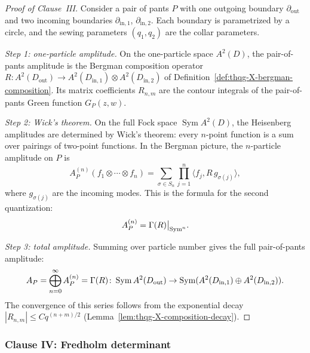 \begin{proof}[Proof of Clause~III]
Consider a pair of pants $P$ with one outgoing boundary $\partial_{\mathrm{out}}$
and two incoming boundaries $\partial_{\mathrm{in},1}$, $\partial_{\mathrm{in},2}$.
Each boundary is parametrized by a circle, and the sewing
parameters $(q_1, q_2)$ are the collar parameters.

\emph{Step 1: one-particle amplitude.}
On the one-particle space $A^2(D)$, the pair-of-pants amplitude
is the Bergman composition operator
$R \colon A^2(D_{\mathrm{out}}) \to
A^2(D_{\mathrm{in},1}) \otimes A^2(D_{\mathrm{in},2})$
of Definition~\ref{def:thqg-X-bergman-composition}.
Its matrix coefficients $R_{n,m}$ are the contour integrals
of the pair-of-pants Green function $G_P(z,w)$.

\emph{Step 2: Wick's theorem.}
On the full Fock space $\operatorname{Sym} A^2(D)$, the
Heisenberg amplitudes are determined by Wick's theorem:
every $n$-point function is a sum over pairings of two-point
functions. In the Bergman picture, the $n$-particle amplitude
on $P$ is
\begin{equation}%
A_P^{(n)}(f_1 \otimes \cdots \otimes f_n)
= \sum_{\sigma \in S_n}
\prod_{j=1}^{n}
\langle f_j, R\,g_{\sigma(j)}\rangle,
\end{equation}
where $g_{\sigma(j)}$ are the incoming modes. This is the formula for the second quantization:
\[
A_P^{(n)}
= \Gamma(R)\big|_{\operatorname{Sym}^n}.
\]

\emph{Step 3: total amplitude.}
Summing over particle number gives the full pair-of-pants
amplitude:
\begin{equation}%
A_P
= \bigoplus_{n=0}^{\infty}
A_P^{(n)}
= \secquant(R)
\colon \operatorname{Sym} A^2(D_{\mathrm{out}})
\to
\operatorname{Sym}(A^2(D_{\mathrm{in},1})
\oplus A^2(D_{\mathrm{in},2})).
\end{equation}
The convergence of this series follows from the exponential
decay $|R_{n,m}| \leq C q^{(n+m)/2}$
(Lemma~\ref{lem:thqg-X-composition-decay}).
\end{proof}

\subsubsection{Clause IV: Fredholm determinant}

